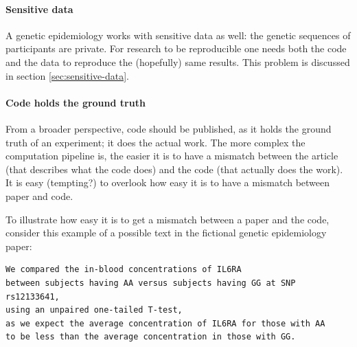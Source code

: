 \paragraph{Sensitive data}

A genetic epidemiology works with sensitive data as well:
the genetic sequences of participants are private.
For research to be reproducible one needs both the code and the data
to reproduce the (hopefully) same results.
This problem is discussed in section \ref{sec:sensitive-data}.

\paragraph{Code holds the ground truth}

From a broader perspective, code should be published, as it holds the
ground truth of an experiment; it does the actual work.
The more complex the computation pipeline is, the easier it is
to have a mismatch between the article (that describes what the
code does) and the code (that actually does the work).
It is easy (tempting?) to overlook how easy it is to have a mismatch
between paper and code.

To illustrate how easy it is to get a mismatch between a paper
and the code, 
consider this example of a possible text in the fictional 
genetic epidemiology paper:

\begin{verbatim}
We compared the in-blood concentrations of IL6RA 
between subjects having AA versus subjects having GG at SNP rs12133641,
using an unpaired one-tailed T-test,
as we expect the average concentration of IL6RA for those with AA 
to be less than the average concentration in those with GG.
\end{verbatim}

